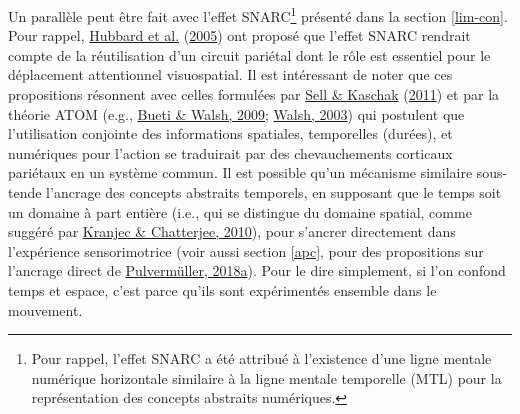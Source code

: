 \documentclass[
  a4paper,12pt,twoside,onecolumn,openright,final,oldfontcommands]{memoir}
\begin{document}
Un parallèle peut être fait avec l'effet SNARC\footnote{Pour rappel, l'effet SNARC a été attribué à l'existence d'une ligne mentale numérique horizontale similaire à la ligne mentale temporelle (MTL) pour la représentation des concepts abstraits numériques.} présenté dans la section \ref{lim-con}. Pour rappel, \protect\hyperlink{ref-hubbard_interactions_2005}{Hubbard et al.} (\protect\hyperlink{ref-hubbard_interactions_2005}{2005}) ont proposé que l'effet SNARC rendrait compte de la réutilisation d'un circuit pariétal dont le rôle est essentiel pour le déplacement attentionnel visuospatial. Il est intéressant de noter que ces propositions résonnent avec celles formulées par \protect\hyperlink{ref-sell_processing_2011}{Sell \& Kaschak} (\protect\hyperlink{ref-sell_processing_2011}{2011}) et par la théorie ATOM (e.g., \protect\hyperlink{ref-bueti_parietal_2009}{Bueti \& Walsh, 2009}; \protect\hyperlink{ref-walsh_theory_2003}{Walsh, 2003}) qui postulent que l'utilisation conjointe des informations spatiales, temporelles (durées), et numériques pour l'action se traduirait par des chevauchements corticaux pariétaux en un système commun. Il est possible qu'un mécanisme similaire sous-tende l'ancrage des concepts abstraits temporels, en supposant que le temps soit un domaine à part entière (i.e., qui se distingue du domaine spatial, comme suggéré par \protect\hyperlink{ref-kranjec_are_2010}{Kranjec \& Chatterjee, 2010}), pour s'ancrer directement dans l'expérience sensorimotrice (voir aussi section \ref{apc}, pour des propositions sur l'ancrage direct de \protect\hyperlink{ref-pulvermuller_neural_2018}{Pulvermüller, 2018a}). Pour le dire simplement, si l'on confond temps et espace, c'est parce qu'ils sont expérimentés ensemble dans le mouvement.
\end{document}
